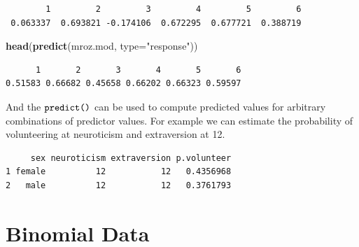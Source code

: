 \documentclass[
]{article}
\newenvironment{Shaded}{\begin{snugshade}}{\end{snugshade}}
\newcommand{\DataTypeTok}[1]{\textcolor[rgb]{0.13,0.29,0.53}{#1}}
\newcommand{\DecValTok}[1]{\textcolor[rgb]{0.00,0.00,0.81}{#1}}
\newcommand{\KeywordTok}[1]{\textcolor[rgb]{0.13,0.29,0.53}{\textbf{#1}}}
\newcommand{\NormalTok}[1]{#1}
\newcommand{\OperatorTok}[1]{\textcolor[rgb]{0.81,0.36,0.00}{\textbf{#1}}}
\newcommand{\StringTok}[1]{\textcolor[rgb]{0.31,0.60,0.02}{#1}}
\begin{document}
\begin{verbatim}
        1         2         3         4         5         6 
 0.063337  0.693821 -0.174106  0.672295  0.677721  0.388719 
\end{verbatim}

\begin{Shaded}
\begin{Highlighting}[]
\KeywordTok{head}\NormalTok{(}\KeywordTok{predict}\NormalTok{(mroz.mod, }\DataTypeTok{type=}\StringTok{"response"}\NormalTok{))}
\end{Highlighting}
\end{Shaded}

\begin{verbatim}
      1       2       3       4       5       6 
0.51583 0.66682 0.45658 0.66202 0.66323 0.59597 
\end{verbatim}

And the \(\verb+predict()+\) can be used to compute predicted values for
arbitrary combinations of predictor values. For example we can estimate
the probability of volunteering at neuroticism and extraversion at 12.

\begin{Shaded}
\end{Shaded}

\begin{verbatim}
     sex neuroticism extraversion p.volunteer
1 female          12           12   0.4356968
2   male          12           12   0.3761793
\end{verbatim}

\hypertarget{binomial-data}{%
\section{Binomial Data}\label{binomial-data}}
\end{document}
